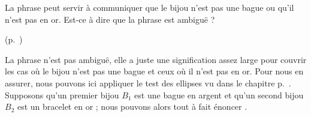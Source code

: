 \begin{exo}\label{exo:1Ambig2}
La phrase  peut servir à communiquer que le bijou n'est pas une bague ou %
qu'il n'est pas en or.  Est-ce à dire que la phrase est ambiguë ? 
\begin{solu}(p.~\pageref{exo:1Ambig2})\label{crg:1Ambig2}

La phrase  n'est pas ambiguë, elle a juste une signification assez large pour couvrir les cas où le bijou n'est pas une bague et ceux où il n'est pas en or.  Pour nous en assurer, nous pouvons ici appliquer le test des ellipses vu dans le chapitre p.~\pageref{test:ellipse}.  Supposons qu'un premier bijou $B_1$ est une bague en argent et qu'un second bijou $B_2$ est un bracelet en or ; nous pouvons alors tout à fait énoncer . 
\end{solu}
\end{exo}
